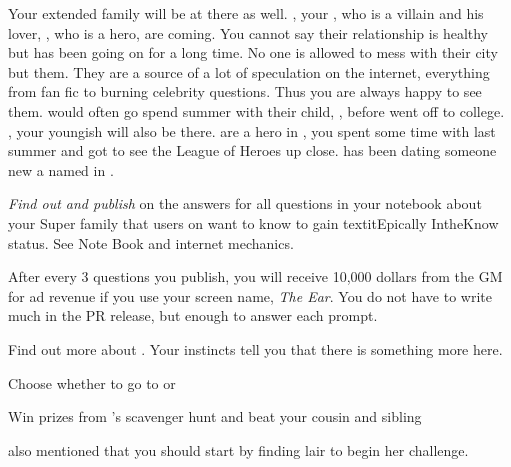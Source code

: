 \documentclass[char]{LRSguildcamp1}
\begin{document}
Your extended family will be at there as well. \cOldest{}, your \cOldest{\uncle}, who is a villain and his lover, \cOS{}, who is a hero, are coming. You cannot say their relationship is healthy but has been going on for a long time. No one is allowed to mess with their city but them. They are a source of a lot of speculation on the internet, everything from fan fic to burning celebrity questions. Thus you are always happy to see them. \cTeen{} would often go spend summer with their child, \cGrad{}, before \cGrad{\they} went off to college.  \cYoungest{}, your youngish \cYoungest{\uncle} will also be there.  are a hero in \pCityYoungest{}, you spent some time with \cYoungest{\them} last summer and got to see the League of Heroes up close.  \cYoungest{} has been dating someone new a \cAS{\hero} named \cAS{} in \pCityYoungest{}. 


\begin{itemz}[Goals]
	\item \textit{Find out and publish} on \pTweenwebsite{} the answers for all questions in your notebook about your Super family that users on \pTweenwebsite{} want to know to gain textit{Epically IntheKnow} status. See Note Book and internet mechanics.	
	
After every 3 questions you publish, you will receive 10,000 dollars from the GM for ad revenue if you use your \pTweenwebsite{} screen name, \textit{The Ear}. You do not have to write much in the PR release, but enough to answer each prompt.
	
	\item Find out more about \cAS{}. Your instincts tell you that there is something more here.
	
	\item Choose whether to go to \pSuperSchool{} or \pNormalSchool{}
	
	\item Win prizes from \cGrandma{}'s scavenger hunt and beat your cousin and sibling
\end{itemz}

\begin{itemz}[Notes]
	\item \cGrandma{} also mentioned that you should start by finding \cGrandma{\their} lair to begin her challenge. 
\end{itemz}
\end{document}
